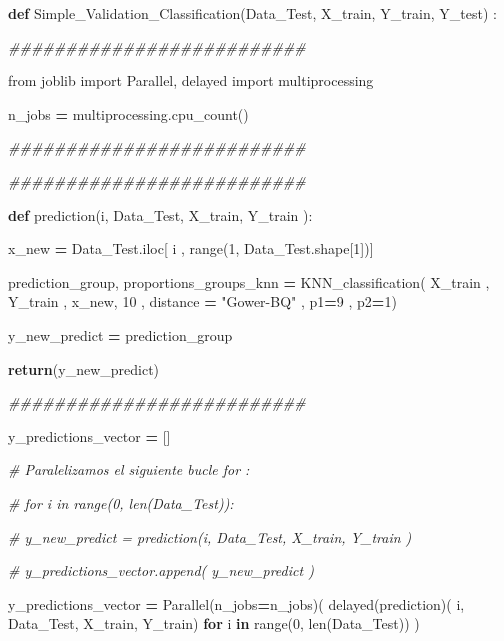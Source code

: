 \documentclass[
  11pt,
  a4paper,
]{article}
\newenvironment{Shaded}{\begin{snugshade}}{\end{snugshade}}
\newcommand{\BuiltInTok}[1]{#1}
\newcommand{\CommentTok}[1]{\textcolor[rgb]{0.56,0.35,0.01}{\textit{#1}}}
\newcommand{\ControlFlowTok}[1]{\textcolor[rgb]{0.13,0.29,0.53}{\textbf{#1}}}
\newcommand{\DecValTok}[1]{\textcolor[rgb]{0.00,0.00,0.81}{#1}}
\newcommand{\ImportTok}[1]{#1}
\newcommand{\KeywordTok}[1]{\textcolor[rgb]{0.13,0.29,0.53}{\textbf{#1}}}
\newcommand{\NormalTok}[1]{#1}
\newcommand{\OperatorTok}[1]{\textcolor[rgb]{0.81,0.36,0.00}{\textbf{#1}}}
\newcommand{\StringTok}[1]{\textcolor[rgb]{0.31,0.60,0.02}{#1}}
\begin{document}
\begin{Shaded}
\begin{Highlighting}[]
\KeywordTok{def}\NormalTok{ Simple\_Validation\_Classification(Data\_Test, X\_train, Y\_train, Y\_test) :}

    \CommentTok{\#\#\#\#\#\#\#\#\#\#\#\#\#\#\#\#\#\#\#\#\#\#\#\#\#\#}

    \ImportTok{from}\NormalTok{ joblib }\ImportTok{import}\NormalTok{ Parallel, delayed}
    \ImportTok{import}\NormalTok{ multiprocessing}

\NormalTok{    n\_jobs  }\OperatorTok{=}\NormalTok{ multiprocessing.cpu\_count()}

    \CommentTok{\#\#\#\#\#\#\#\#\#\#\#\#\#\#\#\#\#\#\#\#\#\#\#\#\#\#}

    \CommentTok{\#\#\#\#\#\#\#\#\#\#\#\#\#\#\#\#\#\#\#\#\#\#\#\#\#\#}

    \KeywordTok{def}\NormalTok{ prediction(i, Data\_Test, X\_train, Y\_train ):}

\NormalTok{     x\_new }\OperatorTok{=}\NormalTok{ Data\_Test.iloc[ i , }\BuiltInTok{range}\NormalTok{(}\DecValTok{1}\NormalTok{, Data\_Test.shape[}\DecValTok{1}\NormalTok{])]}

\NormalTok{     prediction\_group, proportions\_groups\_knn  }\OperatorTok{=}\NormalTok{  KNN\_classification( X\_train , Y\_train , x\_new, }\DecValTok{10}\NormalTok{ , distance }\OperatorTok{=} \StringTok{"Gower{-}BQ"}\NormalTok{ , p1}\OperatorTok{=}\DecValTok{9}\NormalTok{ , p2}\OperatorTok{=}\DecValTok{1}\NormalTok{)}
     
\NormalTok{     y\_new\_predict }\OperatorTok{=}\NormalTok{ prediction\_group}

     \ControlFlowTok{return}\NormalTok{(y\_new\_predict)}

    \CommentTok{\#\#\#\#\#\#\#\#\#\#\#\#\#\#\#\#\#\#\#\#\#\#\#\#\#\#}

\NormalTok{    y\_predictions\_vector }\OperatorTok{=}\NormalTok{ []}

    \CommentTok{\# Paralelizamos el siguiente bucle for :}

    \CommentTok{\# for i in  range(0, len(Data\_Test)):}

        \CommentTok{\# y\_new\_predict = prediction(i, Data\_Test, X\_train, Y\_train )}

        \CommentTok{\# y\_predictions\_vector.append( y\_new\_predict )}

    
\NormalTok{    y\_predictions\_vector }\OperatorTok{=}\NormalTok{ Parallel(n\_jobs}\OperatorTok{=}\NormalTok{n\_jobs)( delayed(prediction)( i, Data\_Test, X\_train, Y\_train) }\ControlFlowTok{for}\NormalTok{ i }\KeywordTok{in} \BuiltInTok{range}\NormalTok{(}\DecValTok{0}\NormalTok{, }\BuiltInTok{len}\NormalTok{(Data\_Test)) )}


\end{Highlighting}
\end{Shaded}
\end{document}
